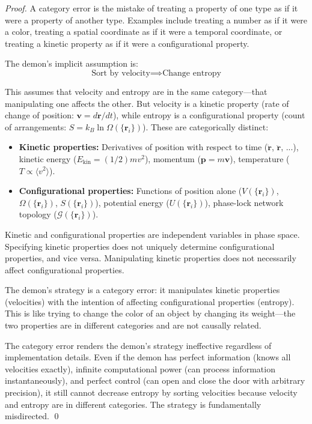 \documentclass[12pt,a4paper]{article}
\theoremstyle{definition}
\theoremstyle{remark}
\newcommand{\phaselockgraph}{\mathcal{G}}
\begin{document}
\begin{proof}
A category error is the mistake of treating a property of one type as if it were a property of another type. Examples include treating a number as if it were a color, treating a spatial coordinate as if it were a temporal coordinate, or treating a kinetic property as if it were a configurational property.

The demon's implicit assumption is:
\begin{equation}
\text{Sort by velocity} \implies \text{Change entropy}
\end{equation}

This assumes that velocity and entropy are in the same category—that manipulating one affects the other. But velocity is a kinetic property (rate of change of position: $\mathbf{v} = d\mathbf{r}/dt$), while entropy is a configurational property (count of arrangements: $S = k_B \ln \Omega(\{\mathbf{r}_i\})$). These are categorically distinct:

\begin{itemize}
    \item \textbf{Kinetic properties:} Derivatives of position with respect to time ($\dot{\mathbf{r}}$, $\ddot{\mathbf{r}}$, ...), kinetic energy ($E_{\text{kin}} = (1/2) m v^2$), momentum ($\mathbf{p} = m \mathbf{v}$), temperature ($T \propto \langle v^2 \rangle$).
    \item \textbf{Configurational properties:} Functions of position alone ($V(\{\mathbf{r}_i\})$, $\Omega(\{\mathbf{r}_i\})$, $S(\{\mathbf{r}_i\})$), potential energy ($U(\{\mathbf{r}_i\})$), phase-lock network topology ($\phaselockgraph(\{\mathbf{r}_i\})$).
\end{itemize}

Kinetic and configurational properties are independent variables in phase space. Specifying kinetic properties does not uniquely determine configurational properties, and vice versa. Manipulating kinetic properties does not necessarily affect configurational properties.

The demon's strategy is a category error: it manipulates kinetic properties (velocities) with the intention of affecting configurational properties (entropy). This is like trying to change the color of an object by changing its weight—the two properties are in different categories and are not causally related.

The category error renders the demon's strategy ineffective regardless of implementation details. Even if the demon has perfect information (knows all velocities exactly), infinite computational power (can process information instantaneously), and perfect control (can open and close the door with arbitrary precision), it still cannot decrease entropy by sorting velocities because velocity and entropy are in different categories. The strategy is fundamentally misdirected. \qed
\end{proof}
\end{document}
